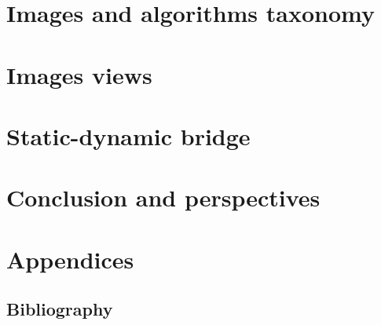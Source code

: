 \documentclass[11pt]{book}
\begin{document}


\cleardoublepage


\part{Images and algorithms taxonomy}
\label{part.image_and_algorithms_taxonomy}



\cleardoublepage


\part{Images views}
\label{part.image_views}



\cleardoublepage


\part{Static-dynamic bridge}
\label{part.static_dynamic_bridge}



\cleardoublepage


\part{Conclusion and perspectives}
\label{part.conclusion_and_perspecitves}



\cleardoublepage


\part{Appendices}
\label{part.annexes}

\appendix

\chapter{Bibliography}
\label{chap.bibliography}


\end{document}
